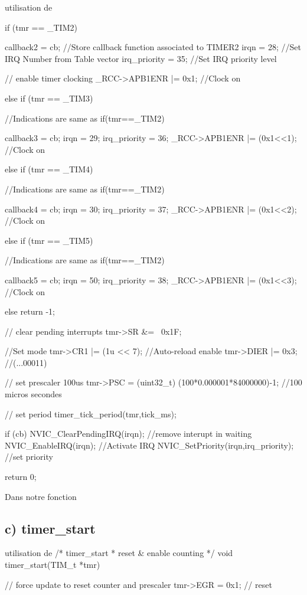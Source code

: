 {\begin{Cpp}{utilisation de }
{	if (tmr == _TIM2) {
	
    callback2 = cb;     //Store callback function associated to TIMER2
		irqn = 28;          //Set IRQ Number from Table vector
		irq_priority = 35;  //Set IRQ priority level

		// enable timer clocking
    _RCC->APB1ENR |= 0x1; //Clock on
        
	} else if (tmr == _TIM3) {
	
	    //Indications are same as if(tmr==_TIM2)
	
		callback3 = cb;
		irqn = 29;
		irq_priority = 36;
		_RCC->APB1ENR |= (0x1<<1); //Clock on
		
	
	} else if (tmr == _TIM4) {
	
	    //Indications are same as if(tmr==_TIM2)
	    
		callback4 = cb;
		irqn = 30;
		irq_priority = 37;
		_RCC->APB1ENR |= (0x1<<2); //Clock on
	
	} else if (tmr == _TIM5) {
		
		//Indications are same as if(tmr==_TIM2)
		
		callback5 = cb;
		irqn = 50;
		irq_priority = 38;
		_RCC->APB1ENR |= (0x1<<3); //Clock on
	
	} else {
		return -1;
	}
	
	// clear pending interrupts
	tmr->SR &= ~0x1F;
	
	//Set mode
	tmr->CR1 |= (1u << 7);          //Auto-reload enable
	tmr->DIER |= 0x3;               //(...00011)
	
	// set prescaler 100us
	tmr->PSC = (uint32_t) (100*0.000001*84000000)-1; //100 micros secondes
	
	// set period
	timer_tick_period(tmr,tick_ms);
	
	if (cb) {
		NVIC_ClearPendingIRQ(irqn);  //remove interupt in waiting 
		NVIC_EnableIRQ(irqn);  			//Activate IRQ
		NVIC_SetPriority(irqn,irq_priority);  //set priority
	}
	
    return 0;
}

\end{Cpp}

Dans notre fonction 


\subsection{c) timer\_start}

\begin{Cpp}{utilisation de } 
/* timer_start
 *   reset & enable counting
 */
void timer_start(TIM_t *tmr)
{
	// force update to reset counter and prescaler
	tmr->EGR = 0x1;		// reset
	
}
\end{Cpp}}
